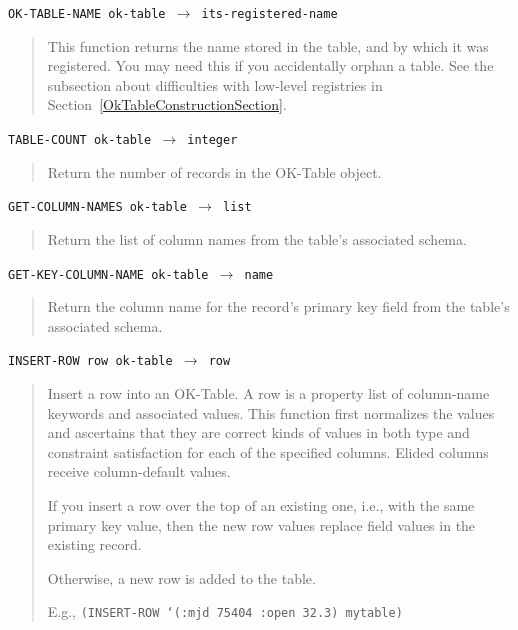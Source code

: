 \documentclass[article,oneside]{memoir}
\begin{document}
\noindent \texttt{OK-TABLE-NAME ok-table $\rightarrow$ its-registered-name}

\begin{quote}
This function returns the name stored in the table, and by which it was registered. You may need this if you accidentally orphan a table. See the subsection about difficulties with low-level registries in Section~\ref{OkTableConstructionSection}.
\end{quote}


\noindent \texttt{TABLE-COUNT ok-table $\rightarrow$ integer}

\begin{quote}
Return the number of records in the OK-Table object.
\end{quote}


\noindent \texttt{GET-COLUMN-NAMES ok-table $\rightarrow$ list}

\begin{quote}
Return the list of column names from the table's associated schema.
\end{quote}

\noindent \texttt{GET-KEY-COLUMN-NAME ok-table $\rightarrow$ name}

\begin{quote}
Return the column name for the record's primary key field from the table's associated schema.
\end{quote}

\pagebreak[3]
\noindent \texttt{INSERT-ROW row ok-table $\rightarrow$ row}

\begin{quote}
Insert a row into an OK-Table. A row is a property list of column-name keywords and associated values. This function first normalizes the values and ascertains that they are correct kinds of values in both type and constraint satisfaction for each of the specified columns. Elided columns receive column-default values.

If you insert a row over the top of an existing one, i.e., with the same primary key value, then the new row values replace field values in the existing record.

Otherwise, a new row is added to the table.

E.g., \texttt{(INSERT-ROW `(:mjd 75404 :open 32.3) mytable)}
\end{quote}
\end{document}
